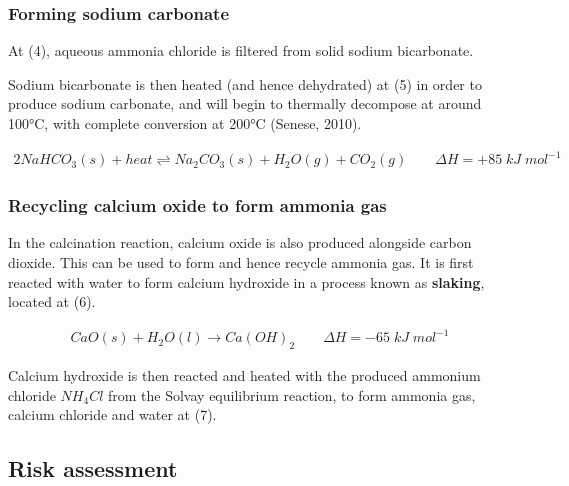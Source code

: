 \documentclass[12pt, a4paper]{article}
\begin{document}
\subsubsection{Forming sodium carbonate}

At (4), aqueous ammonia chloride is filtered from solid sodium bicarbonate. 

Sodium bicarbonate is then heated (and hence dehydrated) at (5) in order to produce sodium carbonate, and will begin to thermally decompose at around 100°C, with complete conversion at 200°C (Senese, 2010).

\begin{align}
	2NaHCO_{3}(s) + heat \rightleftharpoons Na_{2}CO_{3}(s) + H_{2}O(g) + CO_{2}(g) \qquad \Delta H = +85 \; kJ \; mol^{-1}
\end{align}


\subsubsection{Recycling calcium oxide to form ammonia gas}

In the calcination reaction, calcium oxide is also produced alongside carbon dioxide. This can be used to form and hence recycle ammonia gas. It is first reacted with water to form calcium hydroxide in a process known as \textbf{slaking}, located at (6).

\begin{align}
	CaO(s) + H_{2}O(l) \rightarrow Ca(OH)_{2} \qquad \Delta H = -65 \; kJ \; mol^{-1}
\end{align}

Calcium hydroxide is then reacted and heated with the produced ammonium chloride \(NH_{4}Cl\) from the Solvay equilibrium reaction, to form ammonia gas, calcium chloride and water at (7).


\subsection{Risk assessment}
\end{document}
